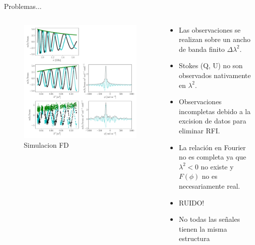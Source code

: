 \documentclass[xetex,aspectratio=169]{beamer}
\begin{document}
	\begin{frame}{Problemas...}
		
		\begin{columns}[onlytextwidth,t]
			\begin{column}{.4\textwidth}
				\begin{figure}
					\centering
					\includegraphics[width=\textwidth, keepaspectratio]{figures/example_ursi.pdf}
					\caption*{Simulacion FD}
				\end{figure}
			\end{column}
			\begin{column}{.6\textwidth}
				\begin{itemize}
					\item Las observaciones se realizan sobre un ancho de banda finito $\Delta \lambda^2$.
					\item Stokes (Q, U) no son observados nativamente en $\lambda^2$.
					\item Observaciones incompletas debido a la excision de datos para eliminar RFI.
					\item La relación en Fourier no es completa ya que $\lambda^2 < 0 $	no existe y $F(\phi)$ no es necesariamente real.
					\item \alert{RUIDO!}
					\item No todas las señales tienen la misma estructura %
				\end{itemize}
			\end{column}
		\end{columns}
		
	\end{frame}
\end{document}
